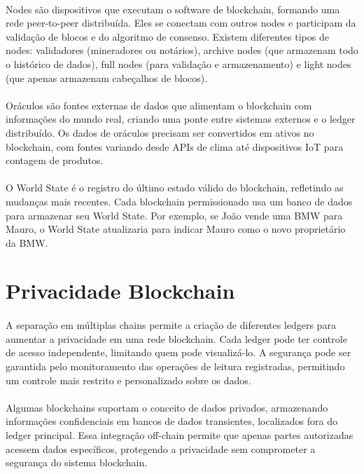\documentclass[letterpaper,11pt,leqno]{article}
\begin{document}
\paragraph{}
Nodes são dispositivos que executam o software de blockchain, formando uma rede
peer-to-peer distribuída. Eles se conectam com outros nodes e participam da
validação de blocos e do algoritmo de consenso. Existem diferentes tipos de
nodes: validadores (mineradores ou notários), archive nodes (que armazenam todo
o histórico de dados), full nodes (para validação e armazenamento) e light nodes
(que apenas armazenam cabeçalhos de blocos).

\paragraph{}
Oráculos são fontes externas de dados que alimentam o blockchain com informações
do mundo real, criando uma ponte entre sistemas externos e o ledger distribuído.
Os dados de oráculos precisam ser convertidos em ativos no blockchain, com
fontes variando desde APIs de clima até dispositivos IoT para contagem de
produtos.

\paragraph{}
O World State é o registro do último estado válido do blockchain, refletindo as
mudanças mais recentes. Cada blockchain permissionado usa um banco de dados para
armazenar seu World State. Por exemplo, se João vende uma BMW para Mauro, o
World State atualizaria para indicar Mauro como o novo proprietário da BMW.

\section{Privacidade Blockchain}

\paragraph{}
A separação em múltiplas chains permite a criação de diferentes ledgers para
aumentar a privacidade em uma rede blockchain. Cada ledger pode ter controle de
acesso independente, limitando quem pode visualizá-lo. A segurança pode ser
garantida pelo monitoramento das operações de leitura registradas, permitindo um
controle mais restrito e personalizado sobre os dados.

\paragraph{}
Algumas blockchains suportam o conceito de dados privados, armazenando
informações confidenciais em bancos de dados transientes, localizados fora do
ledger principal. Essa integração off-chain permite que apenas partes
autorizadas acessem dados específicos, protegendo a privacidade sem comprometer
a segurança do sistema blockchain.
\end{document}
